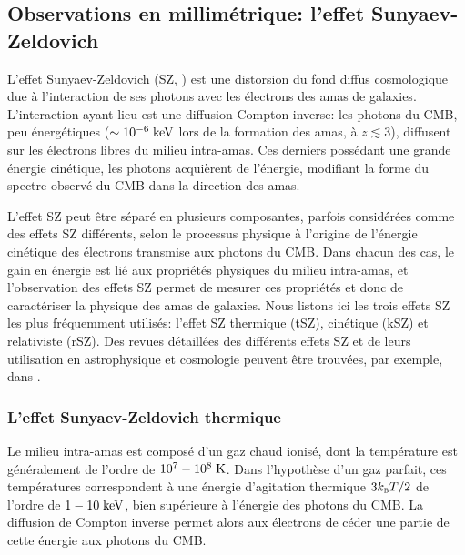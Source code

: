 \subsection{Observations en millimétrique: l'effet Sunyaev-Zeldovich}\label{sec:sz}

L'effet Sunyaev-Zeldovich (SZ, \cite{zeldovich_interaction_1969, sunyaev_interaction_1970,sunyaev_observations_1972,sunyaev_velocity_1980}) est une distorsion du fond diffus cosmologique due à l'interaction de ses photons avec les électrons des amas de galaxies.
L'interaction ayant lieu est une diffusion Compton inverse: les photons du CMB, peu énergétiques ($\sim 10^{-6} \;{\rm keV}$ lors de la formation des amas, à $z \lesssim 3$), diffusent sur les électrons libres du milieu intra-amas.
Ces derniers possédant une grande énergie cinétique, les photons acquièrent de l'énergie, modifiant la forme du spectre observé du CMB dans la direction des amas.

L'effet SZ peut être séparé en plusieurs composantes, parfois considérées comme des effets SZ différents, selon le processus physique à l'origine de l'énergie cinétique des électrons transmise aux photons du CMB.
Dans chacun des cas, le gain en énergie est lié aux propriétés physiques du milieu intra-amas, et l'observation des effets SZ permet de mesurer ces propriétés et donc de caractériser la physique des amas de galaxies.
Nous listons ici les trois effets SZ les plus fréquemment utilisés: l'effet SZ thermique (tSZ), cinétique (kSZ) et relativiste (rSZ).
Des revues détaillées des différents effets SZ et de leurs utilisation en astrophysique et cosmologie peuvent être trouvées, par exemple, dans \cite{birkinshaw_sunyaevzeldovich_1999,carlstrom_cosmology_2002,mroczkowski_astrophysics_2019}.

\subsubsection{L'effet Sunyaev-Zeldovich thermique} %
Le milieu intra-amas est composé d'un gaz chaud ionisé, dont la température est généralement de l'ordre de $10^7 - 10^8 \;{\rm K}$.
Dans l'hypothèse d'un gaz parfait, ces températures correspondent à une énergie d'agitation thermique $3 k_\textsc{b} T / 2$ de l'ordre de $1-10 \;{\rm keV}$, bien supérieure à l'énergie des photons du CMB.
La diffusion de Compton inverse permet alors aux électrons de céder une partie de cette énergie aux photons du CMB.

